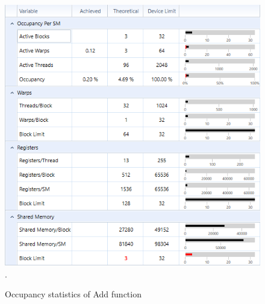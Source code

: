 \documentclass[oneside,openright,12pt,final,en]{mgr}
\begin{document}
\begin{figure}[H]
	\centering
	\includegraphics[width=\textwidth]{add_occupancy}.
	\caption{Occupancy statistics of Add function}
	\label{fig:add_occupancy}
\end{figure}
\end{document}
